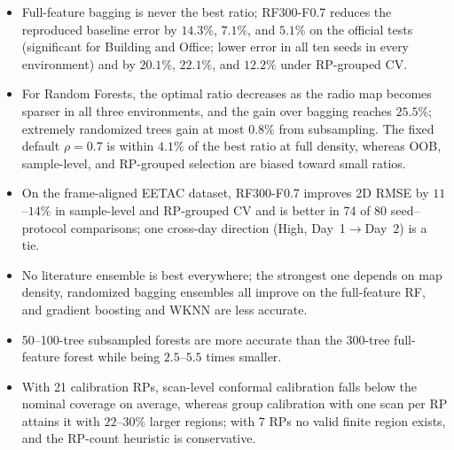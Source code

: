 \begin{itemize}
	\item Full-feature bagging is never the best ratio; RF300-F0.7 reduces the reproduced baseline error by $14.3\%$, $7.1\%$, and $5.1\%$ on the official tests (significant for Building and Office; lower error in all ten seeds in every environment) and by $20.1\%$, $22.1\%$, and $12.2\%$ under RP-grouped CV.
	\item For Random Forests, the optimal ratio decreases as the radio map becomes sparser in all three environments, and the gain over bagging reaches $25.5\%$; extremely randomized trees gain at most $0.8\%$ from subsampling. The fixed default $\rho=0.7$ is within $4.1\%$ of the best ratio at full density, whereas OOB, sample-level, and RP-grouped selection are biased toward small ratios.
	\item On the frame-aligned EETAC dataset, RF300-F0.7 improves 2D RMSE by $11$--$14\%$ in sample-level and RP-grouped CV and is better in 74 of 80 seed--protocol comparisons; one cross-day direction (High, Day~1$\rightarrow$Day~2) is a tie.
	\item No literature ensemble is best everywhere; the strongest one depends on map density, randomized bagging ensembles all improve on the full-feature RF, and gradient boosting and WKNN are less accurate.
	\item 50--100-tree subsampled forests are more accurate than the 300-tree full-feature forest while being $2.5$--$5.5$ times smaller.
	\item With 21 calibration RPs, scan-level conformal calibration falls below the nominal coverage on average, whereas group calibration with one scan per RP attains it with $22$--$30\%$ larger regions; with 7 RPs no valid finite region exists, and the RP-count heuristic is conservative.
\end{itemize}
